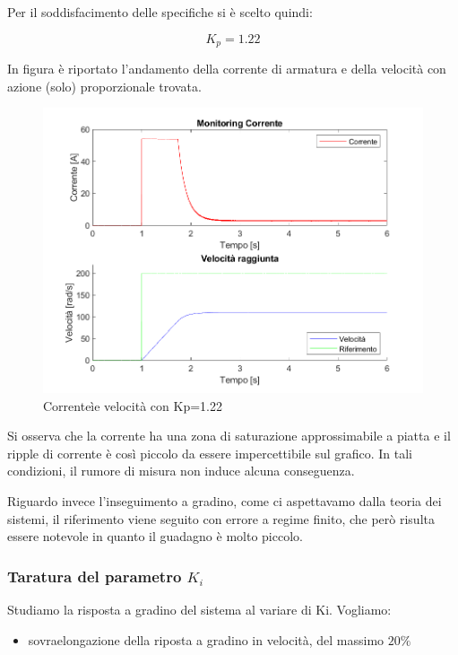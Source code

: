 \documentclass[a4paper,12pt]{article}
\begin{document}
Per il soddisfacimento delle specifiche si è scelto quindi:

\[
    K_p = 1.22
\]

In figura è riportato l'andamento della corrente di armatura e della velocità con azione (solo) proporzionale trovata.

\begin{figure}[h!]
    \centering
    \includegraphics[scale = 0.6]{Immagini/PlotMatlab/controlloSoloProporzionale.png}
    \caption{Correnteìe velocità con Kp=1.22}
    \label{fig:kpscelto}
\end{figure}

\vspace{0.5cm}

Si osserva che la corrente ha una zona di saturazione approssimabile a piatta e il ripple di corrente è così piccolo da essere impercettibile sul grafico.
In tali condizioni, il rumore di misura non induce alcuna conseguenza.

Riguardo invece l'inseguimento a gradino, come ci aspettavamo dalla teoria dei sistemi, il riferimento viene seguito con errore a regime finito, che però risulta essere notevole in quanto il guadagno è molto piccolo.


\subsubsection{Taratura del parametro $K_i$}

Studiamo la risposta a gradino del sistema al variare di Ki.  Vogliamo:

\begin{itemize}
    \item sovraelongazione della riposta a gradino in velocità, del massimo $20\%$
\end{itemize}
\end{document}
